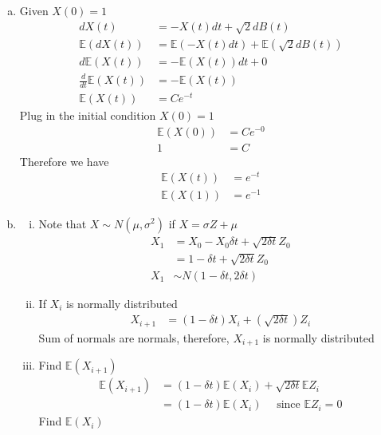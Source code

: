 \documentclass[12pt, letterpaper]{article}
\begin{document}
\begin{enumerate}[a.]
    \item Given $X(0) = 1$
    \begin{align*}
        dX(t) &= -X(t)dt + \sqrt2 dB(t) \\
        \mathbb{E}(dX(t)) &= \mathbb{E}(-X(t)dt) + \mathbb{E}(\sqrt2 dB(t)) \\
        d\mathbb{E}(X(t)) &= -\mathbb{E}(X(t))dt + 0 \\ 
        \frac{d}{dt}\mathbb{E}(X(t)) &= - \mathbb{E}(X(t)) \\
        \mathbb{E}(X(t)) &= Ce^{-t}
    \end{align*}
    Plug in the initial condition $X(0) = 1$
    \begin{align*}
        \mathbb{E}(X(0)) &= Ce^{-0} \\
        1 &= C
    \end{align*} 
    Therefore we have 
    \begin{align*}
        \mathbb{E}(X(t)) &= e^{-t} \\
        \mathbb{E}(X(1)) &= e^{-1}
    \end{align*}
    \item \begin{enumerate}[i.]
        \item Note that $X \sim N(\mu, \sigma^2)$ if $X = \sigma Z + \mu$
        \begin{align*}
            X_1 &= X_0 - X_0\delta t + \sqrt{2\delta t} Z_0 \\
            &= 1 - \delta t + \sqrt{2\delta t} Z_0 \\
            X_1 &\sim N(1-\delta t,2\delta t)
        \end{align*}
        \item If $X_i$ is normally distributed
        \begin{align*}
            X_{i+1} &= (1-\delta t)X_i + (\sqrt{2\delta t}) Z_i
        \end{align*}
        Sum of normals are normals, therefore, $X_{i+1}$ is normally distributed
        \item Find $\mathbb{E}(X_{i+1})$
        \begin{align*}
            \mathbb{E}(X_{i+1}) &= (1-\delta t)\mathbb{E}(X_i) + \sqrt{2\delta t} \mathbb{E} Z_i \\
            &= (1-\delta t)\mathbb{E}(X_i)\quad \text{ since } \mathbb{E}Z_i = 0
        \end{align*}
        Find $\mathbb{E}(X_i)$
        \begin{align*}

\end{align*}
\end{enumerate}
\end{enumerate}
\end{document}
